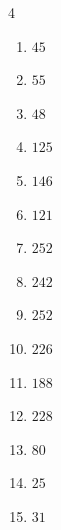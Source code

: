 \begin{multicols}{4}
\begin{enumerate}

  \item $45$


  \item $55$


  \item $48$


  \item $125$


  \item $146$


  \item $121$


  \item $252$


  \item $242$


  \item $252$


\columnbreak %

\resetques

  \item $226$


  \item $188$


  \item $228$


  \item $80$


  \item $25$


  \item $31$


\end{enumerate}
\end{multicols}
